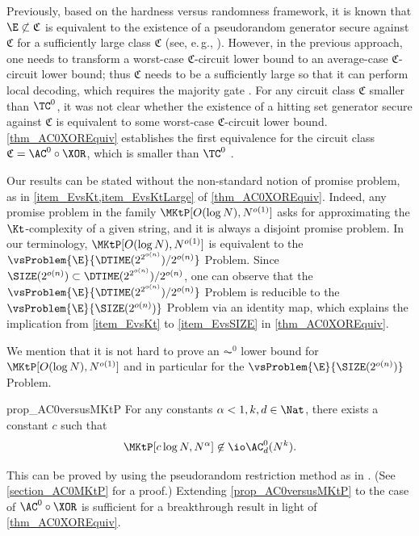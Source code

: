 \documentclass[11pt]{article}
\numberwithin{equation}{section}
\theoremstyle{definition}
\theoremstyle{plain}
\newcommand{\eg}{e.\,g.}
\begin{document}
Previously,
based on the hardness versus randomness framework,
it is known that $\E \not\subset \mathfrak{C}$ is equivalent to the existence of a pseudorandom generator secure against $\mathfrak{C}$
for a sufficiently large class $\mathfrak{C}$ (see, \eg, \cite{Fortnow01_coco_conf}).
However, in the previous approach, one needs to transform a worst-case $\mathfrak{C}$-circuit lower bound to an average-case $\mathfrak{C}$-circuit lower bound;
thus $\mathfrak{C}$ needs to be a sufficiently large so that it
can perform local decoding, which requires the majority gate \cite{ShaltielV10_siamcomp_journals}.
For any circuit class $\mathfrak{C}$ smaller than $\TC^0$,
it was not clear whether the existence of a hitting set generator secure against $\mathfrak{C}$ is equivalent to some worst-case $\mathfrak{C}$-circuit lower bound.
\cref{thm_AC0XOREquiv} establishes the first equivalence
for the circuit class $\mathfrak{C} = \AC^0 \circ \XOR$, which is smaller than $\TC^0$ \cite{Razborov87_lowerbound}.


%
%
%
%
%
Our results
can be stated without the non-standard notion of promise problem, as in \cref{item_EvsKt,item_EvsKtLarge} of \cref{thm_AC0XOREquiv}.
Indeed,
any promise problem in the family $\MKtP[O(\log N), N^{o(1)}]$
asks for approximating the $\Kt$-complexity of a given string,
and it is always a disjoint promise problem.
In our terminology,
$\MKtP[O(\log N), N^{o(1)}]$
is equivalent to the $\vsProblem{\E}{\DTIME(2^{2^{o(n)}})/2^{o(n)}}$ Problem.
Since $\SIZE(2^{o(n)}) \subset \DTIME(2^{2^{o(n)}})/2^{o(n)}$,
one can observe that
the $\vsProblem{\E}{\DTIME(2^{2^{o(n)}})/2^{o(n)}}$ Problem
is reducible to
the $\vsProblem{\E}{\SIZE(2^{o(n)})}$ Problem
via an identity map, which explains the implication from \cref{item_EvsKt} to \cref{item_EvsSIZE} in \cref{thm_AC0XOREquiv}.


%
We mention that it is not hard to prove an $\AC^0$ lower bound for
%
%
%
$\MKtP[O(\log N), N^{o(1)}]$     %
and in particular for the $\vsProblem{\E}{\SIZE(2^{o(n)})}$ Problem.
\begin{theoremref}
  {prop_AC0versusMKtP}
  For any constants $\alpha < 1, k, d \in \Nat$,
  there exists a constant $c$ such that
  $$\MKtP[c \log N, N^{\alpha}] \not\in \io \AC_d^0(N^k).$$
\end{theoremref}
This can be proved by using
the pseudorandom restriction method as in \cite{HiraharaS17_coco_conf, CheraghchiKLM19_icalp_conf, ChenHOPRS20_innovations_conf}.
(See \cref{section_AC0MKtP} for a proof.)
Extending \cref{prop_AC0versusMKtP} to the case of $\AC^0 \circ \XOR$
is sufficient for a breakthrough result in light of \cref{thm_AC0XOREquiv}.
\end{document}
